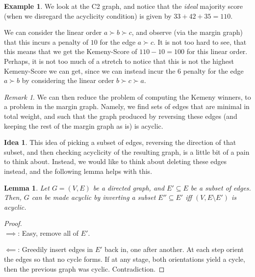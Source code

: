 \documentclass{book}
\theoremstyle{plain}
\newtheorem{lemma}[theorem]{Lemma}
\theoremstyle{definition}
\newtheorem{example}[theorem]{Example}
\newtheorem{idea}[theorem]{Idea}
\theoremstyle{remark}
\newtheorem{remark}[theorem]{Remark}
\begin{document}
\begin{example}
    We look at the C2 graph, 
    and notice that the 
    \emph{ideal} majority 
    score (when we disregard the acyclicity condition)
    is given by 
    $33 + 42 + 35 = 110$.

    We can consider the 
    linear order 
    $a \succ b \succ c$,
    and observe (via the margin graph)
    that this incurs a penalty of 
    $10$ for the edge $a \succ c$.
    It is not too hard to see, that this means that 
    we get the Kemeny-Score of $110 - 10 = 100$ for this linear order.
    Perhaps, it is not too much of a stretch to notice that 
    this is not the 
    highest Kemeny-Score we can get,
    since we can instead incur the 
    $6$ penalty for the edge $a \succ b$ by considering the linear order
    $b \succ c \succ a$.
\end{example}

\begin{remark}
    We can then reduce the 
    problem of computing the Kemeny winners, 
    to a problem in the 
    margin graph. 
    Namely, 
    we find sets of edges
    that are minimal in total weight, 
    and such that the graph produced 
    by reversing these edges (and keeping the 
    rest of the margin graph as is) is acyclic.
\end{remark}

\begin{idea}
    This idea of picking a subset of edges, reversing the 
    direction of that subset, and then checking 
    acyclicity of the resulting graph, is 
    a little bit of a pain to think about.
    Instead, we would like to think about deleting these edges instead,
    and the following lemma helps with this.
\end{idea}

\begin{lemma}\label{l:inversion-to-deletion}
    Let $G = (V, E)$ be a directed graph, 
    and $E' \subseteq E$ be a subset of edges.
    Then, 
    $G$ can be made acyclic by inverting 
    a subset $E'' \subseteq E'$
    iff
    $(V, E \setminus E')$ is acyclic.
\end{lemma}

\begin{proof}
    \leavevmode \\
    ${\implies}$:
    Easy, remove all of $E'$.

    ${\impliedby}$:
    Greedily insert edges in $E'$ back in,
    one after another. At each step orient the 
    edges so that no cycle forms. If at any stage, 
    both orientations yield a cycle, 
    then the previous graph was cyclic. 
    Contradiction.
\end{proof}
\end{document}
